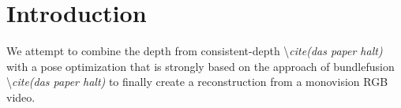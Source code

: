 \chapter{Introduction}
    We attempt to combine the depth from consistent-depth \textbackslash \textit{cite(das paper halt)} with a pose optimization that is strongly based on the approach of bundlefusion \textbackslash \textit{cite(das paper halt)} to finally create a reconstruction from a monovision RGB video.